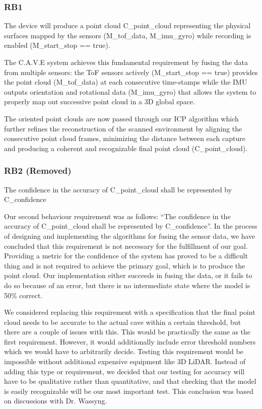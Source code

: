 \documentclass[11pt]{article}
\begin{document}
	\subsubsection{RB1} 
	
	\begin{exampleblock}
		The device will produce a point cloud C\_point\_cloud representing the physical surfaces mapped by the sensors (M\_tof\_data, M\_imu\_gyro) while recording is enabled (M\_start\_stop == true).
	\end{exampleblock}
	
	The C.A.V.E system achieves this fundamental requirement by fusing the data from multiple sensors: the ToF sensors actively (M\_start\_stop == true) provides the point cloud (M\_tof\_data) at each consecutive time-stamps while the IMU outputs orientation and rotational data (M\_imu\_gyro) that allows the system to properly map out successive point cloud in a 3D global space.
	
	The oriented point clouds are now passed through our ICP algorithm which further refines the reconstruction of the scanned environment by aligning the consecutive point cloud frames, minimizing the distance between each capture and producing a coherent and recognizable final point cloud (C\_point\_cloud).
	
	\subsubsection{RB2 (Removed)}
	 
	\begin{exampleblock}[red]
		The confidence in the accuracy of C\_point\_cloud shall be represented by C\_confidence
	\end{exampleblock}
	
	Our second behaviour requirement was as follows: “The confidence in the accuracy of C\_point\_cloud shall be represented by C\_confidence”. In the process of designing and implementing the algorithms for fusing the sensor data, we have concluded that this requirement is not necessary for the fulfillment of our goal. Providing a metric for the confidence of the system has proved to be a difficult thing and is not required to achieve the primary goal, which is to produce the point cloud. Our implementation either succeeds in fusing the data, or it fails to do so because of an error, but there is no intermediate state where the model is 50\% correct. 
	
	We considered replacing this requirement with a specification that the final point cloud needs to be accurate to the actual cave within a certain threshold, but there are a couple of issues with this. This would be practically the same as the first requirement. However, it would additionally include  error threshold numbers which we would have to arbitrarily decide. Testing this requirement would be impossible without additional expensive equipment like 3D LiDAR. Instead of adding this type or requirement, we decided that our testing for accuracy will have to be qualitative rather than quantitative, and that checking that the model is easily recognizable will be our most important test. This conclusion was based on discussions with Dr. Wassyng. 
	
\end{document}
